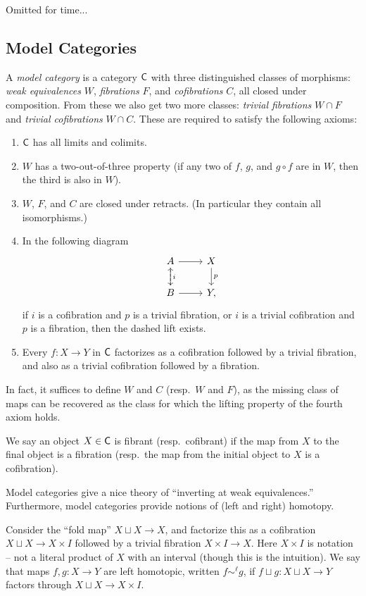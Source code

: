 \documentclass{amsart}
\begin{document}
Omitted for time...

\subsection{Model Categories}

\begin{dfn}
	A \emph{model category} is a category $\mathsf{C}$ with three distinguished classes of morphisms: \emph{weak equivalences} $W$, \emph{fibrations} $F$, and \emph{cofibrations} $C$, all closed under composition.
	From these we also get two more classes: \emph{trivial fibrations} $W \cap F$ and \emph{trivial cofibrations} $W \cap C$.
	These are required to satisfy the following axioms:
	\begin{enumerate}
		\item $\mathsf{C}$ has all limits and colimits.
		\item $W$ has a two-out-of-three property (if any two of $f$, $g$, and $g \circ f$ are in $W$, then the third is also in $W$).
		\item $W$, $F$, and $C$ are closed under retracts.
			(In particular they contain all isomorphisms.)
		\item In the following diagram
			\[
				\begin{tikzcd}
					A \rar \dar["i"] & X \dar["p"] \\
					B \rar \uar[dashed] & Y,
				\end{tikzcd}
			\]
			if $i$ is a cofibration and $p$ is a trivial fibration, or $i$ is a trivial cofibration and $p$ is a fibration, then the dashed lift exists.
		\item Every $f: X \to Y$ in $\mathsf{C}$ factorizes as a cofibration followed by a trivial fibration, and also as a trivial cofibration followed by a fibration.
	\end{enumerate}
	In fact, it suffices to define $W$ and $C$ (resp.\ $W$ and $F$), as the missing class of maps can be recovered as the class for which the lifting property of the fourth axiom holds.
	
	We say an object $X \in \mathsf{C}$ is fibrant (resp.\ cofibrant) if the map from $X$ to the final object is a fibration (resp.\ the map from the initial object to $X$ is a cofibration).
\end{dfn}

Model categories give a nice theory of ``inverting at weak equivalences.''
Furthermore, model categories provide notions of (left and right) homotopy.

\begin{dfn}
	Consider the ``fold map'' $X \sqcup X \to X$, and factorize this as a cofibration $X \sqcup X \to X \times I$ followed by a trivial fibration $X \times I \to X$.
	Here $X \times I$ is notation -- not a literal product of $X$ with an interval (though this is the intuition).
	We say that maps $f, g: X \to Y$ are left homotopic, written $f \sim^\ell g$, if $f \sqcup g: X \sqcup X \to Y$ factors through $X \sqcup X \to X \times I$.
\end{dfn}
\end{document}
